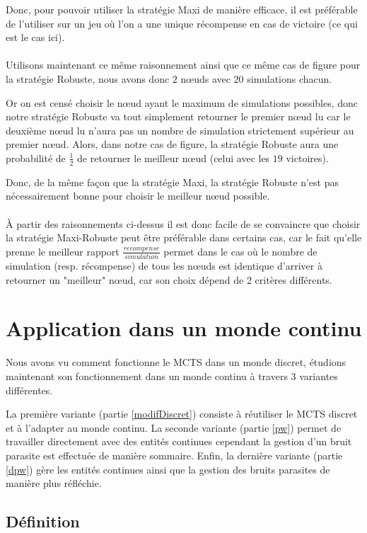 \documentclass[pdftex,french, english]{article}	%
\begin{document}
Donc, pour pouvoir utiliser la stratégie Maxi de manière efficace, il est préférable de l'utiliser sur un jeu où l'on a une unique récompense en cas de victoire (ce qui est le cas ici).
\\ \\
Utilisons maintenant ce même raisonnement ainsi que ce même cas de figure pour la stratégie Robuste, nous avons donc $2$ nœuds avec $20$ simulations chacun. 

Or on est censé choisir le nœud ayant le maximum de simulations possibles, donc notre stratégie Robuste va tout simplement retourner le premier nœud lu car le deuxième nœud lu n'aura pas un nombre de simulation strictement supérieur au premier nœud. Alors, dans notre cas de figure, la stratégie Robuste aura une probabilité de $\frac{1}{2}$ de retourner le meilleur nœud (celui avec les $19$ victoires).

Donc, de la même façon que la stratégie Maxi, la stratégie Robuste n'est pas nécessairement bonne pour choisir le meilleur nœud possible.
\\ \\
À partir des raisonnements ci-dessus il est donc facile de se convaincre que choisir la stratégie Maxi-Robuste peut être préférable dans certains cas, car le fait qu'elle prenne le meilleur rapport $\frac{recompense}{simulation}$ permet dans le cas où le nombre de simulation (resp. récompense) de tous les nœuds est identique d'arriver à retourner un "meilleur" nœud, car son choix dépend de 2 critères différents.

\newpage

\section{Application dans un monde continu} \label{continu}

Nous avons vu comment fonctionne le MCTS dans un monde discret, étudions maintenant son fonctionnement dans un monde continu à travers 3 variantes différentes. 

La première variante (partie \ref{modifDiscret}) consiste à réutiliser le MCTS discret et à l'adapter au monde continu. La seconde variante (partie \ref{pw}) permet de travailler directement avec des entités continues cependant la gestion d'un bruit parasite est effectuée de manière sommaire. Enfin, la dernière variante (partie \ref{dpw}) gère les entités continues ainsi que la gestion des bruits parasites de manière plus réfléchie.
	\subsection{Définition}
\end{document}
